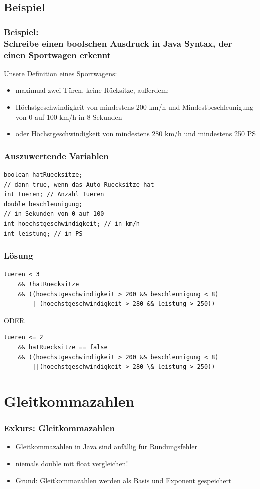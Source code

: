 \documentclass[final]{beamer}
\begin{document}
\subsection{Beispiel}
\begin{frame}
	\frametitle{Beispiel: \\Schreibe einen boolschen Ausdruck in Java Syntax, der einen Sportwagen erkennt}
	Unsere Definition eines Sportwagens:	\\
	\begin{itemize}
		\item{maximual zwei Türen, keine Rücksitze, außerdem:}
		\item{Höchstgeschwindigkeit von mindestens 200 km/h und  Mindestbeschleunigung von 0 auf 100 km/h in 8 Sekunden}
		\item{oder Höchstgeschwindigkeit von mindestens 280 km/h und mindestens 250 PS}
	\end{itemize}
\end{frame}

\begin{frame}[containsverbatim]
	\frametitle{Auszuwertende Variablen}
	\begin{lstlisting}
boolean hatRuecksitze; 
// dann true, wenn das Auto Ruecksitze hat
int tueren; // Anzahl Tueren
double beschleunigung; 
// in Sekunden von 0 auf 100
int hoechstgeschwindigkeit; // in km/h
int leistung; // in PS
	\end{lstlisting}
\end{frame}


\begin{frame}[containsverbatim]
	\frametitle{Lösung}
\begin{lstlisting}
tueren < 3
	&& !hatRuecksitze
	&& ((hoechstgeschwindigkeit > 200 && beschleunigung < 8)
		| (hoechstgeschwindigkeit > 280 && leistung > 250))
\end{lstlisting}
\vfill
ODER
\vfill
\begin{lstlisting}
tueren <= 2
	&& hatRuecksitze == false
	&& ((hoechstgeschwindigkeit > 200 && beschleunigung < 8)
		||(hoechstgeschwindigkeit > 280 \& leistung > 250))
\end{lstlisting}

\end{frame}

\section{Gleitkommazahlen}
\begin{frame}
	\frametitle{Exkurs: Gleitkommazahlen}
	\begin{itemize}
		\item{Gleitkommazahlen in Java sind anfällig für Rundungsfehler}
		\item{niemals double mit float vergleichen!}
		\item{Grund: Gleitkommazahlen werden als Basis und Exponent gespeichert}
	\end{itemize}
\end{frame}
\end{document}
